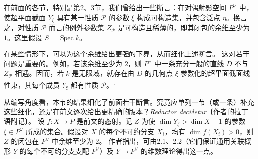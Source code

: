 \begingroup
\def\PP{\mathbb P}\def\OO{\mathcal O}\def\Ocal{\mathcal O}
\def\F{\mathcal F}\def\G{\mathcal G}\def\N{\mathcal N}
\def\PD{\check P}\def\Pdual{\check P}
\def\Ys{Y^{\mathrm{sing}}}\def\Ysing{Y^{\mathrm{sing}}}
\def\Ds{Y^{\mathrm{sup\,sing}}}\def\Ysup{Y^{\mathrm{sup\,sing}}}
\def\cod{\operatorname{codim}}\def\Sing{\operatorname{Sing}}
\def\depth{\operatorname{depth}}\def\coprof{\operatorname{coprof}}
\def\Ass{\operatorname{Ass}}\def\Supp{\operatorname{Supp}}
\def\Gr{\operatorname{Gr}}\def\Spec{\operatorname{Spec}}\def\Proj{\operatorname{Proj}}
在前面的各节，特别是第2、3节，我们曾给出一些断言：在对偶射影空间 $P^\vee$ 中，使超平面截面 $Y_\xi$ 具有某一性质 $\mathcal P$ 的参数 $\xi$ 构成可构造集，并包含泛点 $\eta$。换言之，对性质 $\mathcal P$ 而言的例外参数集 $Z_{\mathcal P}$ 是可构造且稀薄的，即其闭包的余维至少为 $1$。这里假设 $S=\Spec k$。

在某些情形下，可以为这个余维给出更强的下界，从而细化上述断言。
这对若干问题是重要的。例如，若该余维至少为 $2$，则 $P^\vee$ 中一条充分一般的直线 $D$ 不与 $Z_{\mathcal P}$ 相遇。因而，若 $k$ 是无限域，就存在由 $D$ 的几何点 $\xi$ 参数化的超平面截面线性束，其每个成员 $Y_\xi$ 都有性质 $\mathcal P$。\textsuperscript{,}

从编写角度看，本节的结果细化了前面若干断言。究竟应单列一节（或一条）补充这些细化，还是在前文逐次给出更精确的版本？\emph{Redactor decidetur}〔作者的拉丁语附记〕。
设 $f:X\to P$ 是前文的态射。记 $Z$ 为使 $\dim Y_\xi>\dim X-1$ 的参数 $\xi\in P^\vee$ 所成的集合。假设对 $X$ 的每个不可约分支 $X_i$，均有 $\dim f(X_i)>0$，则 $Z$ 的闭包在 $P^\vee$ 中余维至少为 $2$。
作者指出，可由2.1、2.2（它们保证通用关联概形 $Y$ 的每个不可约分支支配 $P^\vee$）及 $Y\to P^\vee$ 的维数理论得出这一点。

